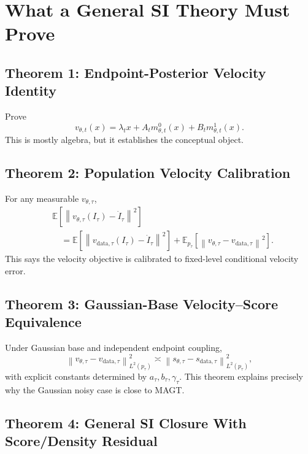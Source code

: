\documentclass[11pt]{article}
\newcommand{\E}{\mathbb{E}}
\newcommand{\norm}[1]{\left\lVert #1 \right\rVert}
\newcommand{\data}{\mathrm{data}}
\theoremstyle{plain}
\theoremstyle{definition}
\begin{document}
\section{What a General SI Theory Must Prove}

\subsection{Theorem 1: Endpoint-Posterior Velocity Identity}

Prove
\begin{equation}
v_{\theta,t}(x)
=
\lambda_t x
+A_t m_{\theta,t}^0(x)
+B_t m_{\theta,t}^1(x).
\end{equation}
This is mostly algebra, but it establishes the conceptual object.

\subsection{Theorem 2: Population Velocity Calibration}

For any measurable \(v_{\theta,\tau}\),
\begin{align}
&\E
\left[
\norm{v_{\theta,\tau}(I_\tau)-\dot I_\tau}^2
\right] \nonumber\\
&\quad =
\E
\left[
\norm{v_{\data,\tau}(I_\tau)-\dot I_\tau}^2
\right]
+
\E_{p_\tau}
\left[
\norm{v_{\theta,\tau}-v_{\data,\tau}}^2
\right].
\end{align}
This says the velocity objective is calibrated to fixed-level conditional
velocity error.

\subsection{Theorem 3: Gaussian-Base Velocity--Score Equivalence}

Under Gaussian base and independent endpoint coupling,
\begin{equation}
\norm{v_{\theta,\tau}-v_{\data,\tau}}_{L^2(p_\tau)}^2
\asymp
\norm{s_{\theta,\tau}-s_{\data,\tau}}_{L^2(p_\tau)}^2,
\end{equation}
with explicit constants determined by \(a_\tau,b_\tau,\gamma_\tau\). This theorem
explains precisely why the Gaussian noisy case is close to MAGT.

\subsection{Theorem 4: General SI Closure With Score/Density Residual}
\end{document}
